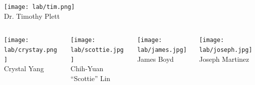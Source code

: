 \begin{frame}[c]{}
\begin{columns}[t]
\begin{column}[T]{3.5in}
\begin{columns}[t]
				\begin{column}[T]{1in}
					{\centering
						\texttt{[image: lab/tim.png]} \\
						\vspace{-.1in}
						{\tiny Dr. Timothy Plett} \\
						\par
					}
				\end{column}
				
				
				
				
			\end{columns}
			
			\vspace{.1in}
			
			\begin{columns}[t]
			
				\begin{column}[T]{1in}
					{\centering
						\texttt{[image: lab/crystay.png]} \\
						\vspace{-.1in}
						{\tiny Crystal Yang} \\
						\par
					}
				\end{column}
			
				\begin{column}[T]{1in}
					{\centering
						\texttt{[image: lab/scottie.jpg]} \\
						\vspace{-.1in}
						{\tiny Chih-Yuan ``Scottie'' Lin} \\
						\par
					}
				\end{column}
			
				\begin{column}[T]{1in}
					{\centering
						\texttt{[image: lab/james.jpg]} \\
						\vspace{-.1in}
						{\tiny James Boyd} \\
						\par
					}
				\end{column}
			
				\begin{column}[T]{1in}
					{\centering
						\texttt{[image: lab/joseph.jpg]} \\
						\vspace{-.1in}
						{\tiny Joseph Martinez} \\
						\par
					}
				\end{column}
				

\end{columns}
\end{column}
\end{columns}
\end{frame}
